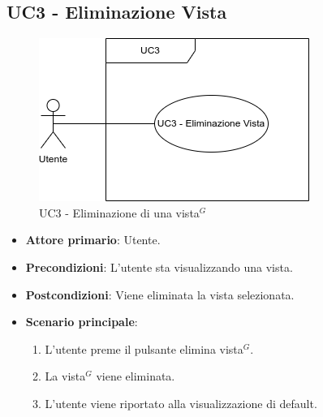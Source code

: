 

\subsection{UC3 - Eliminazione Vista}
\label{sec:UC3}
\begin{figure}[h!]
    \centering
    \includegraphics[scale=0.60]{../../assets/eliminazione_vista.png}
    \caption{UC3 - Eliminazione di una vista$^{G}$}
\end{figure}
\begin{itemize}
    \item \textbf{Attore primario}: Utente.
    \item \textbf{Precondizioni}: L'utente sta visualizzando una vista.
    \item \textbf{Postcondizioni}: Viene eliminata la vista selezionata.
    \item \textbf{Scenario principale}:
          \begin{enumerate}
              \item L'utente preme il pulsante elimina vista$^{G}$.
              \item La vista$^{G}$ viene eliminata.
              \item L'utente viene riportato alla visualizzazione di default.
          \end{enumerate}
\end{itemize}
\newpage


